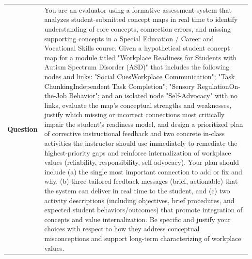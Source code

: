\begin{longtable}{@{}l p{12.5cm}@{}}
  \textbf{Question} & You are an evaluator using a formative assessment system that analyzes student-submitted concept maps in real time to identify understanding of core concepts, connection errors, and missing supporting concepts in a Special Education / Career and Vocational Skills course. Given a hypothetical student concept map for a module titled "Workplace Readiness for Students with Autism Spectrum Disorder (ASD)" that includes the following nodes and links: "Social CuesWorkplace Communication"; "Task ChunkingIndependent Task Completion"; "Sensory RegulationOn-the-Job Behavior"; and an isolated node "Self-Advocacy" with no links, evaluate the map's conceptual strengths and weaknesses, justify which missing or incorrect connections most critically impair the student's readiness model, and design a prioritized plan of corrective instructional feedback and two concrete in-class activities the instructor should use immediately to remediate the highest-priority gaps and reinforce internalization of workplace values (reliability, responsibility, self-advocacy). Your plan should include (a) the single most important connection to add or fix and why, (b) three tailored feedback messages (brief, actionable) that the system can deliver in real time to the student, and (c) two activity descriptions (including objectives, brief procedures, and expected student behaviors/outcomes) that promote integration of concepts and value internalization. Be specific and justify your choices with respect to how they address conceptual misconceptions and support long-term characterizing of workplace values. \\

\end{longtable}
